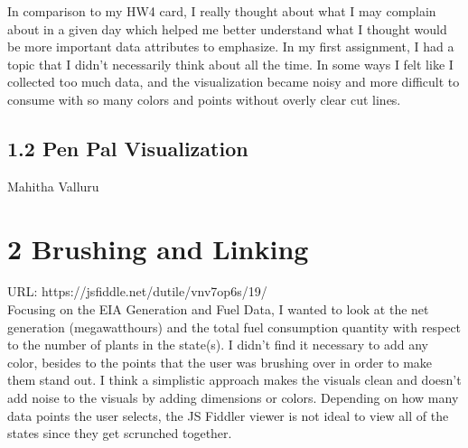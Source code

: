\documentclass{neu_handout}
\begin{document}
In comparison to my HW4 card, I really thought about what I may complain about in a given day which helped me better understand what I thought would be more important data attributes to emphasize. In my first assignment, I had a topic that I didn't necessarily think about all the time. In some ways I felt like I collected too much data, and the visualization became noisy and more difficult to consume with so many colors and points without overly clear cut lines.


\subsection*{1.2 Pen Pal Visualization}

Mahitha Valluru


\section*{2 Brushing and Linking}

URL: https://jsfiddle.net/dutile/vnv7op6s/19/ \\

Focusing on the EIA Generation and Fuel Data, I wanted to look at the net generation (megawatthours) and the total fuel consumption quantity with respect to the number of plants in the state(s). I didn't find it necessary to add any color, besides to the points that the user was brushing over in order to make them stand out. I think a simplistic approach makes the visuals clean and doesn't add noise to the visuals by adding dimensions or colors. Depending on how many data points the user selects, the JS Fiddler viewer is not ideal to view all of the states since they get scrunched together.
\end{document}

